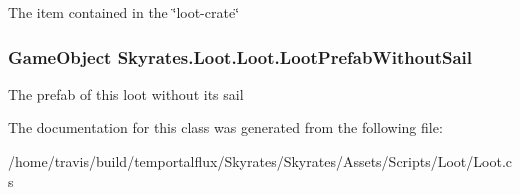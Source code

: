 The item contained in the \char`\"{}loot-\/crate\char`\"{} 

\hypertarget{class_skyrates_1_1_loot_1_1_loot_aa873e9eb80e4da687e0b98339d469cc4}{
\subsubsection[{Loot\-Prefab\-Without\-Sail}]{\setlength{\rightskip}{0pt plus 5cm}Game\-Object Skyrates.\-Loot.\-Loot.\-Loot\-Prefab\-Without\-Sail}}\label{class_skyrates_1_1_loot_1_1_loot_aa873e9eb80e4da687e0b98339d469cc4}


The prefab of this loot without its sail 



The documentation for this class was generated from the following file\-:\begin{DoxyCompactItemize}
\item 
/home/travis/build/temportalflux/\-Skyrates/\-Skyrates/\-Assets/\-Scripts/\-Loot/Loot.\-cs\end{DoxyCompactItemize}
